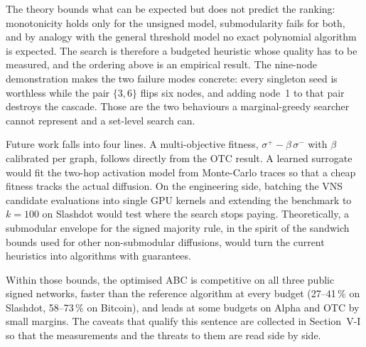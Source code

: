 \documentclass[journal,letterpaper,10pt]{IEEEtran}
\begin{document}
The theory bounds what can be expected but does not predict the ranking: monotonicity holds only for the unsigned model, submodularity fails for both, and by analogy with the general threshold model no exact polynomial algorithm is expected. The search is therefore a budgeted heuristic whose quality has to be measured, and the ordering above is an empirical result. The nine-node demonstration makes the two failure modes concrete: every singleton seed is worthless while the pair $\{3,6\}$ flips six nodes, and adding node~1 to that pair destroys the cascade. Those are the two behaviours a marginal-greedy searcher cannot represent and a set-level search can.

Future work falls into four lines. A multi-objective fitness, $\sigma^{+}-\beta\,\sigma^{-}$ with $\beta$ calibrated per graph, follows directly from the OTC result. A learned surrogate would fit the two-hop activation model from Monte-Carlo traces so that a cheap fitness tracks the actual diffusion. On the engineering side, batching the VNS candidate evaluations into single GPU kernels and extending the benchmark to $k=100$ on Slashdot would test where the search stops paying. Theoretically, a submodular envelope for the signed majority rule, in the spirit of the sandwich bounds used for other non-submodular diffusions, would turn the current heuristics into algorithms with guarantees.

Within those bounds, the optimised ABC is competitive on all three public signed networks, faster than the reference algorithm at every budget (27--41\,\% on Slashdot, 58--73\,\% on Bitcoin), and leads at some budgets on Alpha and OTC by small margins. The caveats that qualify this sentence are collected in Section~V-I so that the measurements and the threats to them are read side by side.
\end{document}
